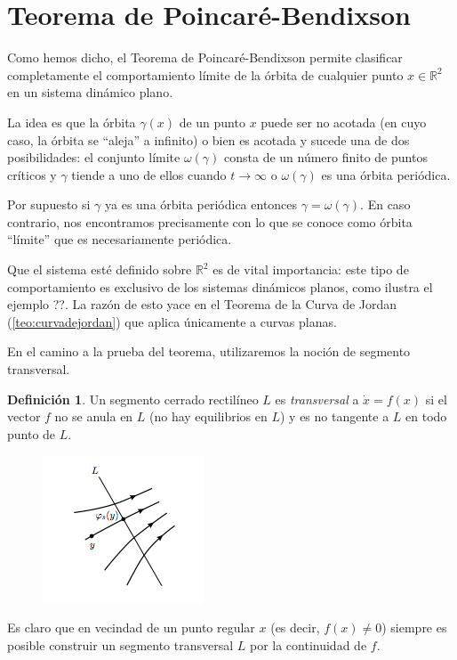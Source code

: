 \documentclass[11pt]{book}
\theoremstyle{definition}
\newtheorem{definition}{Definición}
\numberwithin{definition}{section}
\theoremstyle{theorem}
\numberwithin{theorem}{section}
\numberwithin{lemma}{section}
\numberwithin{corollary}{section}
\theoremstyle{plain}
\numberwithin{example}{section}
\newcommand{\R}{{\ensuremath{\mathbb{R}}}}
\begin{document}
\section{Teorema de Poincaré-Bendixson}

Como hemos dicho, el Teorema de Poincaré-Bendixson permite clasificar completamente el comportamiento límite de la órbita de cualquier punto $x \in \R^2$ en un sistema dinámico plano.

La idea es que la órbita $\gamma(x)$ de un punto $x$ puede ser no acotada (en cuyo caso, la órbita se ``aleja'' a infinito) o bien es acotada y sucede una de dos posibilidades: el conjunto límite $\omega(\gamma)$ consta de un número finito de puntos críticos y $\gamma$ tiende a uno de ellos cuando $t \to \infty$ o $\omega(\gamma)$ es una órbita periódica.

Por supuesto si $\gamma$ ya es una órbita periódica entonces $\gamma = \omega(\gamma)$. En caso contrario, nos encontramos precisamente con lo que se conoce como órbita ``límite'' que es necesariamente periódica.

Que el sistema esté definido sobre $\R^2$ es de vital importancia: este tipo de comportamiento es exclusivo de los sistemas dinámicos planos, como ilustra el ejemplo ??. La razón de esto yace en el Teorema de la Curva de Jordan (\ref{teo:curvadejordan}) que aplica únicamente a curvas planas.

En el camino a la prueba del teorema, utilizaremos la noción de segmento transversal.

\begin{definition}Un segmento cerrado rectilíneo $L$ es \emph{transversal} a $\dot{x} = f(x)$ si el vector $f$ no se anula en $L$ (no hay equilibrios en $L$) y es no tangente a $L$ en todo punto de $L$.
\end{definition}

\begin{figure}[h] \centering
    \includegraphics[scale=1.0]{figures/transversal.png}
\end{figure}

Es claro que en vecindad de un punto regular $x$ (es decir, $f(x) \neq 0$) siempre es posible construir un segmento transversal $L$ por la continuidad de $f$.
\end{document}

